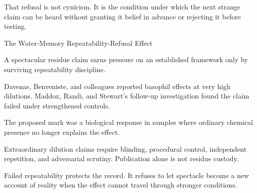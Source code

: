 That refusal is not cynicism. It is the condition under which the next
strange claim can be heard without granting it belief in advance or
rejecting it before testing.

\begin{phenom}{The Water-Memory Repeatability-Refusal Effect~\cite{davenas1988,maddox1988}}
\label{ph:water-memory-repeatability-refusal}

\PhStatement
A spectacular residue claim earns pressure on an established framework only
by surviving repeatability discipline.

\PhOrigin
Davenas, Benveniste, and colleagues reported basophil effects at very high
dilutions. Maddox, Randi, and Stewart's follow-up investigation found the
claim failed under strengthened controls.

\PhObservation
The proposed mark was a biological response in samples where ordinary
chemical presence no longer explains the effect.

\PhConstraint
Extraordinary dilution claims require blinding, procedural control,
independent repetition, and adversarial scrutiny. Publication alone is not
residue custody.

\PhConsequence
Failed repeatability protects the record. It refuses to let spectacle become
a new account of reality when the effect cannot travel through stronger
conditions.
\end{phenom}

